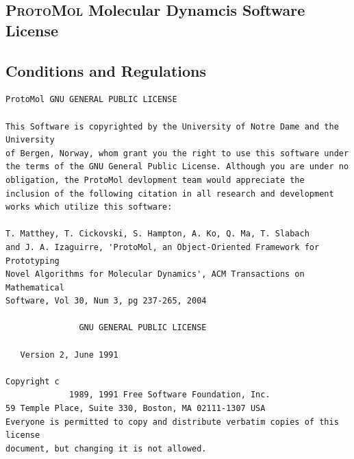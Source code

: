 \documentclass[11pt]{report}
\newcommand{\ProtoMol}{\textsc{ProtoMol }}
\begin{document}
\begin{appendix}

\newpage


\chapter{\ProtoMol Molecular Dynamcis Software License}

\section{Conditions and Regulations}
\footnotesize
\begin{verbatim}
ProtoMol GNU GENERAL PUBLIC LICENSE

This Software is copyrighted by the University of Notre Dame and the University
of Bergen, Norway, whom grant you the right to use this software under
the terms of the GNU General Public License. Although you are under no
obligation, the ProtoMol devlopment team would appreciate the
inclusion of the following citation in all research and development
works which utilize this software:

T. Matthey, T. Cickovski, S. Hampton, A. Ko, Q. Ma, T. Slabach
and J. A. Izaguirre, 'ProtoMol, an Object-Oriented Framework for Prototyping
Novel Algorithms for Molecular Dynamics', ACM Transactions on Mathematical
Software, Vol 30, Num 3, pg 237-265, 2004

               GNU GENERAL PUBLIC LICENSE

   Version 2, June 1991

Copyright c
             1989, 1991 Free Software Foundation, Inc.
59 Temple Place, Suite 330, Boston, MA 02111-1307 USA
Everyone is permitted to copy and distribute verbatim copies of this license
document, but changing it is not allowed.


\end{verbatim}
\end{appendix}
\end{document}
